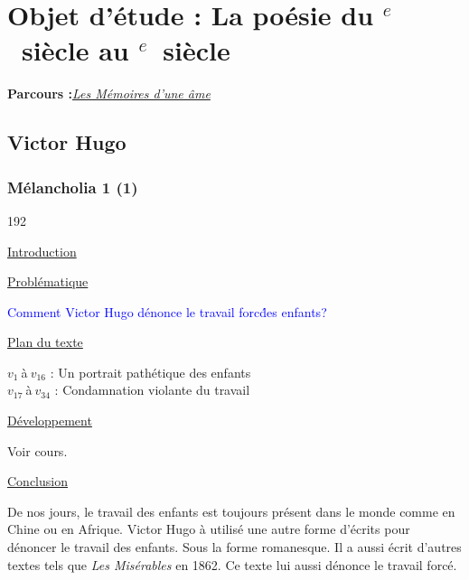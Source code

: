 \documentclass[12pt,a4paper]{article}
\begin{document}
\begin{center}
\setcounter{tocdepth}{4}								%
\renewcommand{\contentsname}{Sommaire}					%
\tableofcontents										%
\end{center}
\newpage
		\section[Les M\'emoires d'une \^ame]{Objet d'\'etude : La po\'esie du \textsc{}$^{e}$~siècle au \textsc{}$^{e}$~siècle}
		\textbf{Parcours :}\textit{\underline{Les M\'emoires d'une \^ame}}
			\subsection{Victor Hugo}
				\subsubsection{M\'elancholia 1 (1) }
\begin{dingautolist}{192}

\item \underline{Introduction} \par


\item \underline{Probl\'ematique }\par
	\textcolor{blue}{Comment Victor Hugo d\'enonce le travail forc\' des enfants?}
\item \underline{Plan du texte} \par
		$v_{1}~$\`a$~v_{16}$ : Un portrait path\'etique des enfants\\
        $v_{17}~$\`a$~v_{34}$ : Condamnation violante du travail 
	

\item \underline{D\'eveloppement} \par
	Voir cours.

\item \underline{Conclusion} \par
	De nos jours, le travail des enfants est toujours pr\'esent dans le monde comme en Chine ou en Afrique. Victor Hugo \`a utilis\'e une autre forme d'\'ecrits pour d\'enoncer le travail des enfants. Sous la forme romanesque. Il a aussi \'ecrit d'autres textes tels que \textit{Les Mis\'erables} en 1862. Ce texte lui aussi d\'enonce le travail forc\'e.


\end{dingautolist}
 \newpage
\end{document}

